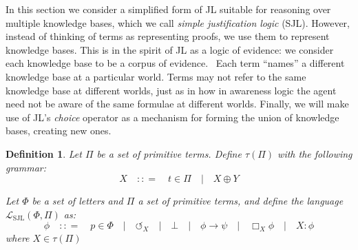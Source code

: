 \documentclass{article}
\newcommand{\tmem}[1]{{\em #1\/}}
\newcommand{\tmop}[1]{\ensuremath{\operatorname{#1}}}
\newcommand{\tmtextit}[1]{{\itshape{#1}}}
\newtheorem{definition}{Definition}
\begin{document}
In this section we consider a simplified form of JL suitable for reasoning
over multiple knowledge bases, which we call \tmtextit{simple justification
logic} (SJL). However, instead of thinking of terms as representing proofs, we
use them to represent knowledge bases. This is in the spirit of JL as a logic
of evidence: we consider each knowledge base to be a corpus of evidence. \
Each term ``names'' a different knowledge base at a particular world.  Terms
may not refer to the same knowledge base at different worlds, just as in how
in awareness logic the agent need not be aware of the same formulae at
different worlds.  Finally, we will make use of JL's {\tmem{choice}} operator
as a mechanism for forming the union of knowledge bases, creating new ones.

\begin{definition}
  Let $\Pi$ be a set of primitive terms.  Define $\tau (\Pi)$ with the
  following grammar:
  \[ X \hspace{1em} : : = \hspace{1em} t \in \Pi \hspace{1em} | \hspace{1em} X
     \oplus Y \]
  
  
  Let $\Phi$ be a set of letters and $\Pi$ a set of primitive terms, and
  define the language $\mathcal{L}_{\tmop{SJL}} (\Phi, \Pi)$ as:
  \[ \phi \hspace{1em} : : = \hspace{1em} p \in \Phi \hspace{1em} |
     \hspace{1em} \circlearrowleft_X \hspace{1em} | \hspace{1em} \bot
     \hspace{1em} | \hspace{1em} \phi \rightarrow \psi \hspace{1em} |
     \hspace{1em} \Box_X \phi \hspace{1em} | \hspace{1em} X : \phi \]
  where $X \in \tau (\Pi)$
\end{definition}
\end{document}
